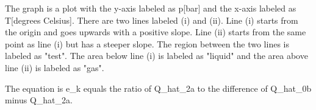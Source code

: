 The graph is a plot with the y-axis labeled as p[bar] and the x-axis labeled as T[degrees Celsius]. There are two lines labeled (i) and (ii). Line (i) starts from the origin and goes upwards with a positive slope. Line (ii) starts from the same point as line (i) but has a steeper slope. The region between the two lines is labeled as "test". The area below line (i) is labeled as "liquid" and the area above line (ii) is labeled as "gas".

The equation is e_k equals the ratio of Q_hat_2a to the difference of Q_hat_0b minus Q_hat_2a.